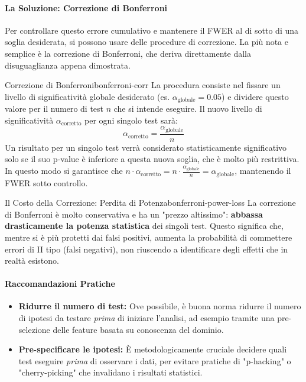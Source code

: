 \paragraph{La Soluzione: Correzione di Bonferroni}
Per controllare questo errore cumulativo e mantenere il FWER al di sotto di una
soglia desiderata, si possono usare delle procedure di correzione. La più nota
e semplice è la correzione di Bonferroni, che deriva direttamente dalla
disuguaglianza appena dimostrata.

\begin{definizione}{Correzione di Bonferroni}{bonferroni-corr}
	La procedura consiste nel fissare un livello di significatività globale
	desiderato (es. \(\alpha_{\text{globale}} = 0.05\)) e dividere questo valore
	per il numero di test \(n\) che si intende eseguire. Il nuovo livello di
	significatività \(\alpha_{\text{corretto}}\) per ogni singolo test sarà:
	\[
		\alpha_{\text{corretto}} = \frac{\alpha_{\text{globale}}}{n}
	\]
	Un risultato per un singolo test verrà considerato statisticamente
	significativo solo se il suo p-value è inferiore a questa nuova soglia, che
	è molto più restrittiva. In questo modo si garantisce che \(n \cdot
	\alpha_{\text{corretto}} = n \cdot \frac{\alpha_{\text{globale}}}{n} =
	\alpha_{\text{globale}}\), mantenendo il FWER sotto controllo.
\end{definizione}

\begin{nota}{Il Costo della Correzione: Perdita di
		Potenza}{bonferroni-power-loss}
	La correzione di Bonferroni è molto conservativa e ha un "prezzo
	altissimo": \textbf{abbassa drasticamente la potenza statistica} dei singoli
	test. Questo significa che, mentre si è più protetti dai falsi positivi,
	aumenta la probabilità di commettere errori di II tipo (falsi negativi),
	non riuscendo a identificare degli effetti che in realtà esistono.
\end{nota}

\paragraph{Raccomandazioni Pratiche}
\begin{itemize}
	\item \textbf{Ridurre il numero di test:} Ove possibile, è buona norma
	      ridurre il numero di ipotesi da testare \textit{prima} di iniziare
	      l'analisi, ad esempio tramite una pre-selezione delle feature basata su
	      conoscenza del dominio.
	\item \textbf{Pre-specificare le ipotesi:} È metodologicamente cruciale
	      decidere quali test eseguire \textit{prima} di osservare i dati, per evitare
	      pratiche di "p-hacking" o "cherry-picking" che invalidano i risultati
	      statistici.
\end{itemize}
